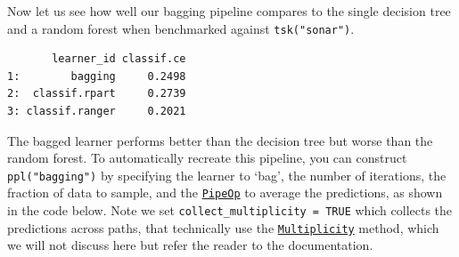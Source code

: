 Now let us see how well our bagging pipeline compares to the single
decision tree and a random forest when benchmarked against
\texttt{tsk("sonar")}.

\begin{Shaded}
\begin{Highlighting}[]
\OtherTok{=} 
\SpecialCharTok{$}\OtherTok{=} 

\OtherTok{=} \NormalTok{(}\NormalTok{)}
\OtherTok{=} \NormalTok{(}\NormalTok{))}

\OtherTok{=} \NormalTok{(}\NormalTok{(}\NormalTok{(}
  \NormalTok{(}\NormalTok{, } \NormalTok{)))}
\SpecialCharTok{$}
\end{Highlighting}
\end{Shaded}

\begin{verbatim}
       learner_id classif.ce
1:        bagging     0.2498
2:  classif.rpart     0.2739
3: classif.ranger     0.2021
\end{verbatim}

The bagged learner performs better than the decision tree but worse than
the random forest. To automatically recreate this pipeline, you can
construct \texttt{ppl("bagging")} by specifying the learner to `bag',
the number of iterations, the fraction of data to sample, and the
\href{https://mlr3pipelines.mlr-org.com/reference/PipeOp.html}{\texttt{PipeOp}}
to average the predictions, as shown in the code below. Note we set
\texttt{collect\_multiplicity\ =\ TRUE} which collects the predictions
across paths, that technically use the
\href{https://mlr3pipelines.mlr-org.com/reference/Multiplicity.html}{\texttt{Multiplicity}}
method, which we will not discuss here but refer the reader to the
documentation.

\begin{Shaded}
\begin{Highlighting}[]
\NormalTok{(}\NormalTok{, }\NormalTok{(}\NormalTok{),}
   \NormalTok{, } \NormalTok{,}
   \NormalTok{(}\NormalTok{, } \NormalTok{))}
\end{Highlighting}
\end{Shaded}

